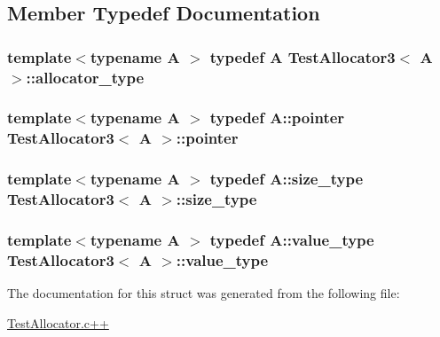 \subsection{Member Typedef Documentation}
\hypertarget{structTestAllocator3_a2cbf292b14532b741aa9c2d29603cecd}{
\subsubsection[{allocator\-\_\-type}]{\setlength{\rightskip}{0pt plus 5cm}template$<$typename A $>$ typedef A {\bf Test\-Allocator3}$<$ A $>$\-::{\bf allocator\-\_\-type}}}\label{structTestAllocator3_a2cbf292b14532b741aa9c2d29603cecd}
\hypertarget{structTestAllocator3_a1e00e0a73b38d61279e77535325b2124}{
\subsubsection[{pointer}]{\setlength{\rightskip}{0pt plus 5cm}template$<$typename A $>$ typedef A\-::pointer {\bf Test\-Allocator3}$<$ A $>$\-::{\bf pointer}}}\label{structTestAllocator3_a1e00e0a73b38d61279e77535325b2124}
\hypertarget{structTestAllocator3_a123816b6d7f35344795ee12a478658d8}{
\subsubsection[{size\-\_\-type}]{\setlength{\rightskip}{0pt plus 5cm}template$<$typename A $>$ typedef A\-::size\-\_\-type {\bf Test\-Allocator3}$<$ A $>$\-::{\bf size\-\_\-type}}}\label{structTestAllocator3_a123816b6d7f35344795ee12a478658d8}
\hypertarget{structTestAllocator3_ac5054dfad63609102029f3bda09f70fc}{
\subsubsection[{value\-\_\-type}]{\setlength{\rightskip}{0pt plus 5cm}template$<$typename A $>$ typedef A\-::value\-\_\-type {\bf Test\-Allocator3}$<$ A $>$\-::{\bf value\-\_\-type}}}\label{structTestAllocator3_ac5054dfad63609102029f3bda09f70fc}


The documentation for this struct was generated from the following file\-:\begin{DoxyCompactItemize}
\item 
\hyperlink{TestAllocator_8c_09_09}{Test\-Allocator.\-c++}\end{DoxyCompactItemize}

